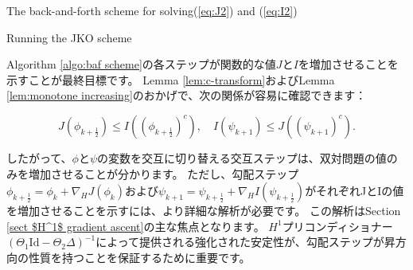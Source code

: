 \documentclass{jsarticle}
\theoremstyle{definition}
\begin{document}
\begin{algorithm}[tb]
    \caption{The back-and-forth scheme for solving(\ref{eq:J2}) and (\ref{eq:I2})}
    \label{algo:baf scheme}
    \begin{algorithmic}
    \end{algorithmic}
\end{algorithm}

\begin{algorithm}[tb]
    \caption{Running the JKO scheme}
    \begin{algorithmic}
    \EndFor
    \end{algorithmic}
\end{algorithm}


Algorithm \ref{algo:baf scheme}の各ステップが関数的な値$J$と$I$を増加させることを示すことが最終目標です。
Lemma \ref{lem:c-transform}およびLemma \ref{lem:monotone increasing}のおかげで、次の関係が容易に確認できます：

\[
    J(\phi_{k + \frac{1}{2}}) \leq I((\phi_{k + \frac{1}{2}})^c), \quad I(\psi_{k+1}) \leq J((\psi_{k+1})^c). 
\]

したがって、$\phi$と$\psi$の変数を交互に切り替える交互ステップは、双対問題の値のみを増加させることが分かります。
ただし、勾配ステップ\(\phi_{k + \frac{1}{2}} = \phi_k + \nabla_H J(\phi_k)\)および\(\psi_{k+1} = \psi_{k + \frac{1}{2}} + \nabla_H I(\psi_{k + \frac{1}{2}})\)がそれぞれJとIの値を増加させることを示すには、より詳細な解析が必要です。
この解析はSection \ref{sect $H^1$ gradient ascent}の主な焦点となります。
$H^1$プリコンディショナー\((\Theta_1 \text{Id}-\Theta_2\Delta)^{-1}\)によって提供される強化された安定性が、勾配ステップが昇方向の性質を持つことを保証するために重要です。
\end{document}
